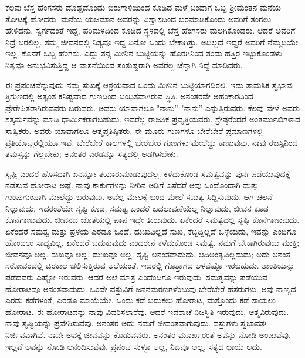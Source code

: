 ಕೆಲವು ಬೆಸ್ತ ಹೆಂಗಸರು ದೊಡ್ಡದೊಂದು ಬಿರುಗಾಳಿಯಿಂದ ಕೂಡಿದ ಮಳೆ ಬಂದಾಗ ಒಬ್ಬ ಶ‍್ರೀಮಂತನ ಮನೆಯ ತೋಟಕ್ಕೆ ಹೋದರು. ಮನೆಯ ಯಜಮಾನ ಅವರನ್ನು ವಿಶ್ವಾಸದಿಂದ ಬರಮಾಡಿಕೊಂಡು ಅವರಿಗೆ ತಂಗಲು ಹೇಳಿದನು. ಸ್ವರ್ಗದಂತೆ ಇದ್ದ, ಪರಿಮಳದಿಂದ ಕೂಡಿದ ಸ್ಥಳದಲ್ಲಿ ಬೆಸ್ತ ಹೆಂಗಸರು ಮಲಗಿಕೊಂಡರು. ಆದರೆ ಅವರಿಗೆ ನಿದ್ರೆ ಬರಲಿಲ್ಲ. ತಮ್ಮ ಜೀವನದಲ್ಲಿ ನಿತ್ಯವೂ ಇದ್ದ ಏನೋ ಒಂದು ಬೇಕಾಗಿತ್ತು. ಅದಿಲ್ಲದೆ ಇದ್ದರೆ ಅವರಿಗೆ ನೆಮ್ಮದಿಯೇ ಇಲ್ಲ. ಕೊನೆಗೆ ಒಬ್ಬ ಹೆಂಗಸು. ಎದ್ದು ತನ್ನ ಮೀನಿನ ಬುಟ್ಟಿಯನ್ನು ಹೊರಗಿನಿಂದ ತಂದು ಹತ್ತಿರ ಇಟ್ಟುಕೊಂಡಳು. ನಿತ್ಯವೂ ಅನುಭವಿಸುತ್ತಿದ್ದ ಆ ವಾಸನೆಯಿಂದ ಸಂತುಷ್ಟರಾಗಿ ಅವರೆಲ್ಲ ಚೆನ್ನಾಗಿ ನಿದ್ದೆ ಮಾಡಿದರು.

ಈ ಪ್ರಪಂಚವೆನ್ನುವುದು ನಮ್ಮ ಸುಖಕ್ಕೆ ಆಶ್ರಯವಾದ ಒಂದು ಮೀನಿನ ಬುಟ್ಟಿಯಾಗದಿರಲಿ. ಇದು ತಾಮಸಿಕ ಸ್ವಭಾವ; ತ್ರಿಗುಣದಲ್ಲಿ ಅತ್ಯಂತ ಕನಿಷ್ಟವಾದ ಗುಣದಿಂದ ಬಂಧಿತವಾಗಿರುವ ಸ್ಥಿತಿ. ಅನಂತರವೇ ಅಹಂಕಾರದಿಂದ ಪ್ರೇರೇಪಿತರಾಗಿರುವವರು ಬರುವರು. ಅವರು ಯಾವಾಗಲೂ "ನಾನು'' "ನಾನು'' ಎನ್ನುತ್ತಿರುವರು. ಕೆಲವು ವೇಳೆ ಅವರು ಸತ್ಕರ್ಮವನ್ನು ಮಾಡಿ ಧಾರ್ಮಿಕರಾಗಬಹುದು. ಇವರೆಲ್ಲ ರಾಜಸಿಕ ಪ್ರವೃತ್ತಿಯವರು. ಶ್ರೇಷ್ಠರೆಂದರೆ ಅಂತರ್ಮುಖಿಗಳಾದ ಸಾತ್ವಿಕರು. ಅವರು ಯಾವಾಗಲೂ ಆತ್ಮಪ್ರತಿಷ್ಠಿತರು. ಈ ಮೂರು ಗುಣಗಳೂ ಬೇರೆಬೇರೆ ಪ್ರಮಾಣಗಳಲ್ಲಿ ಪ್ರತಿಯೊಬ್ಬರಲ್ಲಿಯೂ ಇವೆ. ಬೇರೆಬೇರೆ ಕಾಲಗಳಲ್ಲಿ ಬೇರೆಬೇರೆ ಗುಣಗಳು ಮೇಲೆದ್ದು ಕಾಣುವುವು. ನಾವು ರಜಸ್ಸಿನಿಂದ ತಮಸ್ಸನ್ನು ಗೆಲ್ಲಬೇಕು; ಅನಂತರ ಎರಡನ್ನೂ ಸತ್ಯದಲ್ಲಿ ಅಡಗಿಸಬೇಕು.

ಸೃಷ್ಟಿ ಎಂದರೆ ಹೊಸದಾಗಿ ಏನನ್ನೋ ತಯಾರುಮಾಡುವುದಲ್ಲ. ಕಳೆದುಕೊಂಡ ಸಮತ್ವವನ್ನು ಪುನಃ ಪಡೆಯುವುದಕ್ಕೆ ನಡೆಸುವ ಹೋರಾಟ ಅಷ್ಟೆ. ನಾವು ಕಾರ್ಕುಗಳನ್ನು ನೀರಿನ ಅಡಿಗೆ ಎಸೆದರೆ ಅವು ಒಂದೊಂದಾಗಿ ಮತ್ತು ಗುಂಪುಗುಂಪಾಗಿ ಮೇಲೆದ್ದು ಬರುವುವು. ಅವೆಲ್ಲ ಮೇಲಕ್ಕೆ ಬಂದ ಮೇಲೆ ಸಮತ್ವ ಸಿದ್ದಿಸುವುದು. ಆಗ ಚಲನೆ ನಿಲ್ಲುವುದು. ಇದರಂತೆಯೇ ಸೃಷ್ಟಿ ಕೂಡ. ಸಮತ್ವ ಬಂದರೆ ಬದಲಾವಣೆಯೆಲ್ಲ ನಿಲ್ಲುವುದು, ಜೀವನ ಕೂಡ ಕೊನೆಗಾಣುವುದು. ಜೀವನದ ಜೊತೆಯಲ್ಲಿ ಪಾಪ ಇದ್ದೇ ತೀರುವುದು. ಏಕೆಂದರೆ ಸಮತ್ವದಲ್ಲಿ ಸೃಷ್ಟಿ ಕೊನೆಗಾಣುವುದು. ಏಕೆಂದರೆ ಸಮತ್ವ ಮತ್ತು ಪ್ರಳಯ ಎರಡೂ ಒಂದೆ. ದುಃಖವಿಲ್ಲದೆ ಸುಖ, ಕೆಟ್ಟದ್ದಿಲ್ಲದೆ ಒಳ್ಳೆಯದು, ಇವನ್ನು ಎಂದಿಗೂ ಹೊಂದಲು ಸಾಧ್ಯವಿಲ್ಲ. ಏಕೆಂದರೆ ಬದುಕುವುದು ಎಂದರೇನೆ ಕಳೆದುಕೊಂಡ ಸಮತ್ವ. ನಮಗೆ ಬೇಕಾಗಿರುವುದು ಮುಕ್ತಿ; ಜೀವನವೂ ಅಲ್ಲ, ಸುಖವೂ ಅಲ್ಲ, ದುಃಖವೂ ಅಲ್ಲ. ಸೃಷ್ಟಿ ಅನಂತವಾದುದು, ಆದಿಅಂತ್ಯವಿಲ್ಲದುದು; ಅದು ಅನಂತ ಸರೋವರದಲ್ಲಿ ಚಿರಕಾಲ ಚಲಿಸುತ್ತಿರುವ ಅಲೆಯಂತೆ. ಇದರಲ್ಲಿ ಗೊತ್ತಾಗದ ಆಳವೆಷ್ಟೊ ಇರಬಹುದು. ಶಾಂತಿಯನ್ನು ಪಡೆದವರು ಎಷ್ಟೋ ಇರುವರು. ಆದರೆ ಅಲೆ ಮಾತ್ರ ಎಂದೆಂದಿಗೂ ಇರುವುದು. ಸಮತ್ವವನ್ನು ಪಡೆಯುವ ಹೋರಾಟವೂ ಅನಂತವಾದುದು. ಒಂದೇ ವಸ್ತುವಿಗೆ ಜನನಮರಣಗಳೆಂಬುವು ಬೇರೆಬೇರೆ ಹೆಸರುಗಳು. ಅವು ನಾಣ್ಯದ ಎರಡು ಕಡೆಗಳಂತೆ, ಎರಡೂ ಮಾಯೆಯೇ. ಒಂದು ಕಡೆ ಬದುಕಲು ಹೋರಾಟ, ಮತ್ತೊಂದು ಕಡೆ ಸಾಯಲು ಹೋರಾಟ. ಈ ಹೋರಾಟವನ್ನು ನಾವು ವಿವರಿಸಲಾರೆವು. ಆದರೆ ಇದರಾಚೆ ನಿಜಸ್ಥಿತಿ ಇರುವುದು, ಆತ್ಮವಿರುವುದು. ನಾವು ಸೃಷ್ಟಿಯನ್ನು ಪ್ರವೇಶಿಸುವೆವು. ಅನಂತರ ಅದು ನಮಗೆ ಜೀವಂತವಾಗುವುದು. ವಸ್ತುಗಳು ಸ್ವಭಾವತಃ ನಿರ್ಜಿವವಾಗಿವೆ. ನಾವೇ ಅವಕ್ಕೆ ಜೀವವನ್ನು ಕೊಡುವವರು. ಅನಂತರ ಮೂರ್ಖರಂತೆ ಅವನ್ನು ನೋಡಿ ಅಂಜುವೆವು. ಇಲ್ಲವೆ ಅವನ್ನು ನೋಡಿ ಆನಂದಿಸುವೆವು. ಪ್ರಪಂಚ ಸುಳ್ಳೂ ಅಲ್ಲ, ನಿಜವೂ ಅಲ್ಲ, ಸತ್ಯದ ಛಾಯೆ ಅದು.

